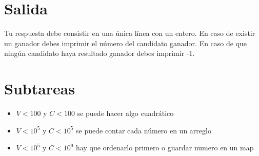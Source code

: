 \documentclass{article}
\begin{document}
\section*{Salida}
Tu respuesta debe consistir en una única línea con un entero. En caso de existir
un ganador debes imprimir el número del candidato ganador. En caso de que ningún
candidato haya resultado ganador debes imprimir -1.

\section*{Subtareas}
\begin{itemize}
  \item $V < 100$ y $C<100$ se puede hacer algo cuadrático
  \item $V < 10^5$ y $C<10^5$ se puede contar cada número en un arreglo
  \item $V < 10^5$ y $C<10^9$ hay que ordenarlo primero o guardar numero en un map
\end{itemize}
\end{document}
